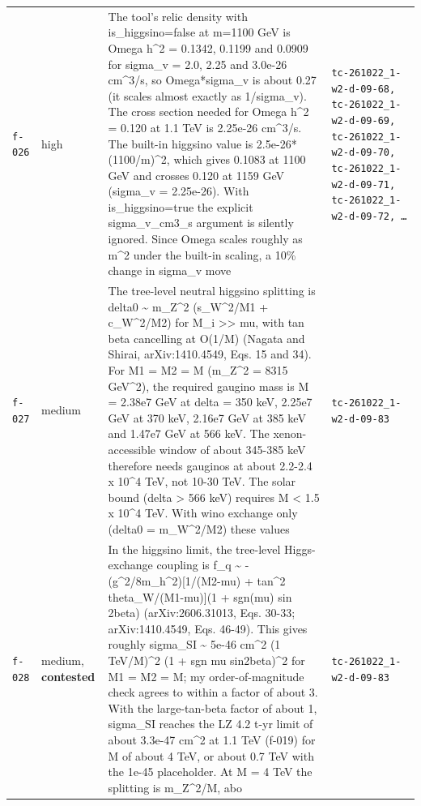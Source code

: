 \documentclass[11pt,a4paper]{article}
\begin{document}
\begin{longtable}{@{}p{}p{}p{}p{}@{}}
\texttt{f-026} & high & The tool's relic density with is\_higgsino=false at m=1100 GeV is Omega h\textasciicircum{}2 = 0.1342, 0.1199 and 0.0909 for sigma\_v = 2.0, 2.25 and 3.0e-26 cm\textasciicircum{}3/s, so Omega*sigma\_v is about 0.27 (it scales almost exactly as 1/sigma\_v). The cross section needed for Omega h\textasciicircum{}2 = 0.120 at 1.1 TeV is 2.25e-26 cm\textasciicircum{}3/s. The built-in higgsino value is 2.5e-26*(1100/m)\textasciicircum{}2, which gives 0.1083 at 1100 GeV and crosses 0.120 at 1159 GeV (sigma\_v = 2.25e-26). With is\_higgsino=true the explicit sigma\_v\_cm3\_s argument is silently ignored. Since Omega scales roughly as m\textasciicircum{}2 under the built-in scaling, a 10\% change in sigma\_v move & \texttt{tc-261022\_\allowbreak{}1-w2-d-09-68,\allowbreak{} tc-261022\_\allowbreak{}1-w2-d-09-69,\allowbreak{} tc-261022\_\allowbreak{}1-w2-d-09-70,\allowbreak{} tc-261022\_\allowbreak{}1-w2-d-09-71,\allowbreak{} tc-261022\_\allowbreak{}1-w2-d-09-72,\allowbreak{} \ldots{}\allowbreak{}} \\
\texttt{f-027} & medium & The tree-level neutral higgsino splitting is delta0 \textasciitilde{} m\_Z\textasciicircum{}2 (s\_W\textasciicircum{}2/M1 + c\_W\textasciicircum{}2/M2) for M\_i \textgreater{}\textgreater{} \textbar{}mu\textbar{}, with tan beta cancelling at O(1/M) (Nagata and Shirai, arXiv:1410.4549, Eqs. 15 and 34). For M1 = M2 = M (m\_Z\textasciicircum{}2 = 8315 GeV\textasciicircum{}2), the required gaugino mass is M = 2.38e7 GeV at delta = 350 keV, 2.25e7 GeV at 370 keV, 2.16e7 GeV at 385 keV and 1.47e7 GeV at 566 keV. The xenon-accessible window of about 345-385 keV therefore needs gauginos at about 2.2-2.4 x 10\textasciicircum{}4 TeV, not 10-30 TeV. The solar bound (delta \textgreater{} 566 keV) requires M \textless{} 1.5 x 10\textasciicircum{}4 TeV. With wino exchange only (delta0 = m\_W\textasciicircum{}2/M2) these values  & \texttt{tc-261022\_\allowbreak{}1-w2-d-09-83} \\
\texttt{f-028} & medium, \textbf{contested} & In the higgsino limit, the tree-level Higgs-exchange coupling is f\_q \textasciitilde{} -(g\textasciicircum{}2/8m\_h\textasciicircum{}2)[1/(M2-\textbar{}mu\textbar{}) + tan\textasciicircum{}2 theta\_W/(M1-\textbar{}mu\textbar{})](1 + sgn(mu) sin 2beta) (arXiv:2606.31013, Eqs. 30-33; arXiv:1410.4549, Eqs. 46-49). This gives roughly sigma\_SI \textasciitilde{} 5e-46 cm\textasciicircum{}2 (1 TeV/M)\textasciicircum{}2 (1 + sgn mu sin2beta)\textasciicircum{}2 for M1 = M2 = M; my order-of-magnitude check agrees to within a factor of about 3. With the large-tan-beta factor of about 1, sigma\_SI reaches the LZ 4.2 t-yr limit of about 3.3e-47 cm\textasciicircum{}2 at 1.1 TeV (f-019) for M of about 4 TeV, or about 0.7 TeV with the 1e-45 placeholder. At M = 4 TeV the splitting is m\_Z\textasciicircum{}2/M, abo & \texttt{tc-261022\_\allowbreak{}1-w2-d-09-83} \\
\bottomrule\end{longtable}
\end{document}
